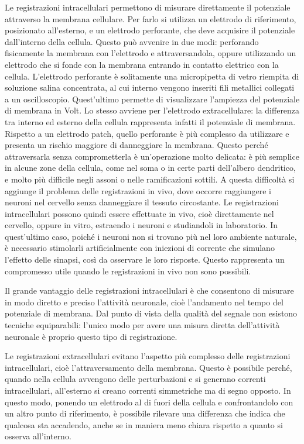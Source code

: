 \documentclass[12pt,a4paper,openany]{book}
\begin{document}
Le registrazioni intracellulari permettono di misurare direttamente il potenziale attraverso la membrana cellulare. Per farlo si utilizza un elettrodo di riferimento, posizionato all'esterno, e un elettrodo perforante, che deve acquisire il potenziale dall'interno della cellula. Questo può avvenire in due modi: perforando fisicamente la membrana con l'elettrodo e attraversandola, oppure utilizzando un elettrodo che si fonde con la membrana entrando in contatto elettrico con la cellula. L'elettrodo perforante è solitamente una micropipetta di vetro riempita di soluzione salina concentrata, al cui interno vengono inseriti fili metallici collegati a un oscilloscopio. Quest'ultimo permette di visualizzare l'ampiezza del potenziale di membrana in Volt. Lo stesso avviene per l'elettrodo extracellulare: la differenza tra interno ed esterno della cellula rappresenta infatti il potenziale di membrana. Rispetto a un elettrodo patch, quello perforante è più complesso da utilizzare e presenta un rischio maggiore di danneggiare la membrana. Questo perché attraversarla senza comprometterla è un'operazione molto delicata: è più semplice in alcune zone della cellula, come nel soma o in certe parti dell'albero dendritico, e molto più difficile negli assoni o nelle ramificazioni sottili. A questa difficoltà si aggiunge il problema delle registrazioni in vivo, dove occorre raggiungere i neuroni nel cervello senza danneggiare il tessuto circostante. Le registrazioni intracellulari possono quindi essere effettuate in vivo, cioè direttamente nel cervello, oppure in vitro, estraendo i neuroni e studiandoli in laboratorio. In quest'ultimo caso, poiché i neuroni non si trovano più nel loro ambiente naturale, è necessario stimolarli artificialmente con iniezioni di corrente che simulano l'effetto delle sinapsi, così da osservare le loro risposte. Questo rappresenta un compromesso utile quando le registrazioni in vivo non sono possibili.

Il grande vantaggio delle registrazioni intracellulari è che consentono di misurare in modo diretto e preciso l'attività neuronale, cioè l'andamento nel tempo del potenziale di membrana. Dal punto di vista della qualità del segnale non esistono tecniche equiparabili: l'unico modo per avere una misura diretta dell'attività neuronale è proprio questo tipo di registrazione.

Le registrazioni extracellulari evitano l'aspetto più complesso delle registrazioni intracellulari, cioè l'attraversamento della membrana. Questo è possibile perché, quando nella cellula avvengono delle perturbazioni e si generano correnti intracellulari, all'esterno si creano correnti simmetriche ma di segno opposto. In questo modo, ponendo un elettrodo al di fuori della cellula e confrontandolo con un altro punto di riferimento, è possibile rilevare una differenza che indica che qualcosa sta accadendo, anche se in maniera meno chiara rispetto a quanto si osserva all'interno.
\end{document}
